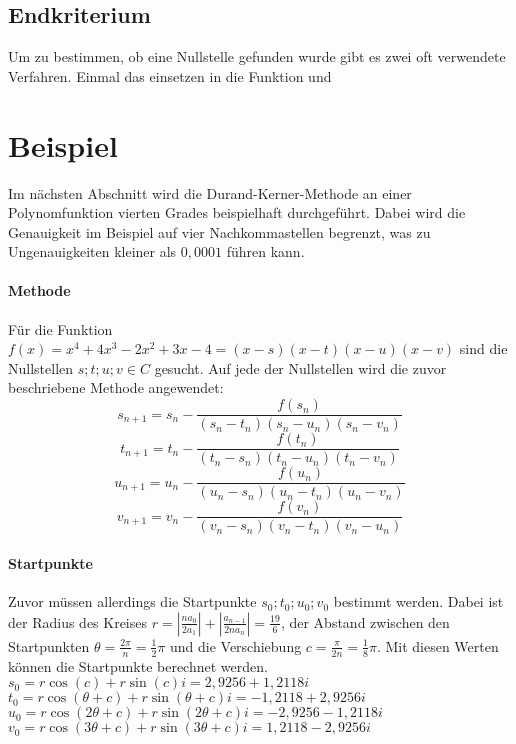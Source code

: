 \documentclass[12pt]{article}
\begin{document}
\subsection{Endkriterium}
Um zu bestimmen, ob eine Nullstelle gefunden wurde gibt es zwei oft verwendete Verfahren. Einmal das einsetzen in die Funktion und 

\section{Beispiel}
Im nächsten Abschnitt wird die Durand-Kerner-Methode an einer Polynomfunktion vierten Grades beispielhaft durchgeführt. Dabei wird die Genauigkeit im Beispiel auf vier Nachkommastellen begrenzt, was zu Ungenauigkeiten kleiner als $0,0001$ führen kann.
\paragraph{Methode}
Für die Funktion $f(x) = x^4 + 4x^3 - 2x^2 + 3x - 4 = (x-s)(x-t)(x-u)(x-v)$ sind die Nullstellen $s;t;u;v \in C$ gesucht. Auf jede der Nullstellen wird die zuvor beschriebene Methode angewendet:
\begin{displaymath}
    s_{n+1} = s_n-\frac{f(s_n)}{(s_n-t_n)(s_n-u_n)(s_n-v_n)}
\end{displaymath}
\begin{displaymath}
    t_{n+1} = t_n-\frac{f(t_n)}{(t_n-s_n)(t_n-u_n)(t_n-v_n)}
\end{displaymath}
\begin{displaymath}
    u_{n+1} = u_n-\frac{f(u_n)}{(u_n-s_n)(u_n-t_n)(u_n-v_n)}
\end{displaymath}
\begin{displaymath}
    v_{n+1} = v_n-\frac{f(v_n)}{(v_n-s_n)(v_n-t_n)(v_n-u_n)}
\end{displaymath}
\paragraph{Startpunkte}
Zuvor müssen allerdings die Startpunkte $s_0;t_0;u_0;v_0$ bestimmt werden. Dabei ist der Radius des Kreises $r = |\frac{na_0}{2a_1}| + |\frac{a_{n-1}}{2na_n}| = \frac{19}{6}$, der Abstand zwischen den Startpunkten $\theta = \frac{2\pi}{n} = \frac{1}{2}\pi$ und die Verschiebung $c = \frac{\pi}{2n} = \frac{1}{8}\pi$. Mit diesen Werten können die Startpunkte berechnet werden. \\
$s_0 = r \cos(c) + r \sin(c)i = 2,9256 + 1,2118i$ \\
$t_0 = r \cos(\theta+c) + r \sin(\theta+c)i = -1,2118 + 2,9256i$ \\
$u_0 = r \cos(2\theta+c) + r \sin(2\theta+c)i = -2,9256 - 1,2118i$ \\
$v_0 = r \cos(3\theta+c) + r \sin(3\theta+c)i = 1,2118 - 2,9256i$
\end{document}
